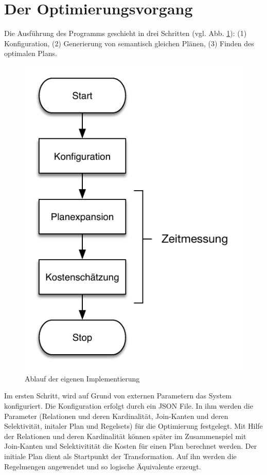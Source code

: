 \section{Der Optimierungsvorgang}


Die Ausführung des Programms geschieht in drei Schritten (vgl. Abb. \ref{Ablauf}): (1) Konfiguration, (2) Generierung von semantisch gleichen Plänen, (3) Finden des optimalen Plans.

\begin{figure}[h]
  \centering
  \includegraphics{04_Implementierung/Ablauf.pdf}
  \caption{Ablauf der eigenen Implementierung}
  \label{Ablauf}
\end{figure}


Im ersten Schritt, wird auf Grund von externen Parametern das System konfiguriert. Die Konfiguration erfolgt durch ein JSON File. In ihm werden die Parameter (Relationen und deren Kardinalität, Join-Kanten und deren Selektivität, initaler Plan und Regelsets) für die Optimierung festgelegt. Mit Hilfe der Relationen und deren Kardinalität können später im Zusammenspiel mit Join-Kanten und Selektivitität die Kosten für einen Plan berechnet werden. Der initiale Plan dient als Startpunkt der Transformation. Auf ihn werden die Regelmengen angewendet und so logische  Äquivalente erzeugt.

